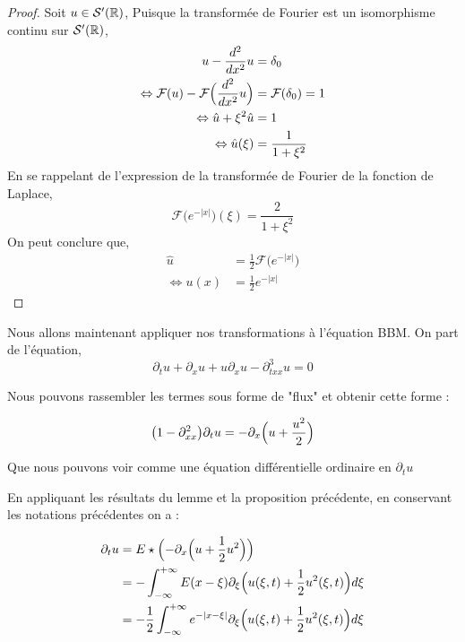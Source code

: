 \begin{proof}
    Soit $u \in \mathcal{S}'(\mathbb{R})$,
    Puisque la transformée de Fourier est un isomorphisme continu sur $\mathcal{S}'(\mathbb{R})$, 
    \begin{equation*}
    \begin{split}
        u - \frac{d^2}{dx^2}u &= \delta_0 \\
        \Leftrightarrow \mathcal{F}(u) - \mathcal{F}\Bigl(\frac{d^2}{dx^2}u\Bigr) &= \mathcal{F}(\delta_0) = 1 \\
        \Leftrightarrow \hat{u} + \xi^2 \hat{u} &= 1 \\
        \Leftrightarrow \hat{u}(\xi) &= \frac{1}{1 + \xi^2}
    \end{split}
    \end{equation*}
    En se rappelant de l'expression de la transformée de Fourier de la fonction de Laplace,
    $$ \mathcal{F}\bigl(e^{-|x|}\bigr)(\xi) = \frac{2}{1 + \xi ^2} $$
    On peut conclure que, 
    \begin{equation*}
    \begin{split}
        \hat{u} &= \frac{1}{2} \mathcal{F}\bigl( e^{-|x|} \bigr)\\
        \Leftrightarrow u(x) &= \frac{1}{2}e^{-|x|}
    \end{split}
    \end{equation*}
\end{proof}

Nous allons maintenant appliquer nos transformations à l'équation BBM. On part de l'équation,
\begin{equation}
    \partial_t u + \partial_x u + u\partial_x u - \partial_{txx}^3 u = 0 \label{BBM}
\end{equation}

Nous pouvons rassembler les termes sous forme de "flux" et obtenir cette forme :

$$ \bigl(1 - \partial_{xx}^2\bigr) \partial_t u = -\partial_x \Bigl( u + \frac{u^2}{2} \Bigr) $$

Que nous pouvons voir comme une équation différentielle ordinaire en $\partial_t u$

En appliquant les résultats du lemme et la proposition précédente, en conservant les notations précédentes
on a :

\begin{equation*}
\begin{split}
    \partial_t u &= E \star \Bigl(-\partial_x \Bigl( u + \frac{1}{2}u^2 \Bigr) \Bigr) \\
    &= - \int_{-\infty}^{+\infty} E(x-\xi) \partial_\xi \Bigl( u(\xi,t) + \frac{1}{2}u^2(\xi,t) \Bigr) d\xi \\
    &= - \frac{1}{2} \int_{-\infty}^{+\infty} e^{-|x - \xi|}\partial_\xi \Bigl( u(\xi,t) + \frac{1}{2}u^2(\xi,t) \Bigr) d\xi
\end{split}
\end{equation*}

